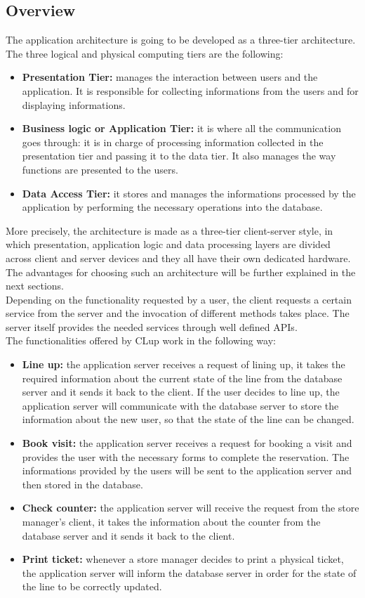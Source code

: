 \documentclass{article}
\begin{document}
\subsection{Overview}
The application architecture is going to be developed as a three-tier architecture. The three logical and physical computing tiers are the following:
\begin{itemize}
\item\textbf{Presentation Tier:} manages the interaction between users and the application. It is responsible for collecting informations from the users and for displaying informations.
\item\textbf{Business logic or Application Tier:} it is where all the communication goes through: it is in charge of processing information collected in the presentation tier and passing it to the data tier. It also manages the way functions are presented to the users.
\item\textbf{Data Access Tier:} it stores and manages the informations processed by the application by performing the necessary operations into the database.
\end{itemize}
More precisely, the architecture is made as a three-tier client-server style, in which presentation, application logic and data processing layers are divided across client and server devices and they all have their own dedicated hardware. The advantages for choosing such an architecture will be further explained in the next sections.
\smallskip\\
Depending on the functionality requested by a user, the client requests a certain service from the server and the invocation of different methods takes place. The server itself provides the needed services through well defined APIs.
\smallskip\\
The functionalities offered by CLup work in the following way:
\begin{itemize}
\item\textbf{Line up:} the application server receives a request of lining up, it takes the required information about the current state of the line from the database server and it sends it back to the client. If the user decides to line up, the application server will communicate with the database server to store the information about the new user, so that the state of the line can be changed. 
\item\textbf{Book visit:} the application server receives a request for booking a visit and provides the user with the necessary forms to complete the reservation. The informations provided by the users will be sent to the application server and then stored in the database.
\item\textbf{Check counter:} the application server will receive the request from the store manager’s client, it takes the information about the counter from the database server and it sends it back to the client.
\item\textbf{Print ticket:} whenever a store manager decides to print a physical ticket, the application server will inform the database server in order for the state of the line to be correctly updated.
\end{itemize}
\end{document}
